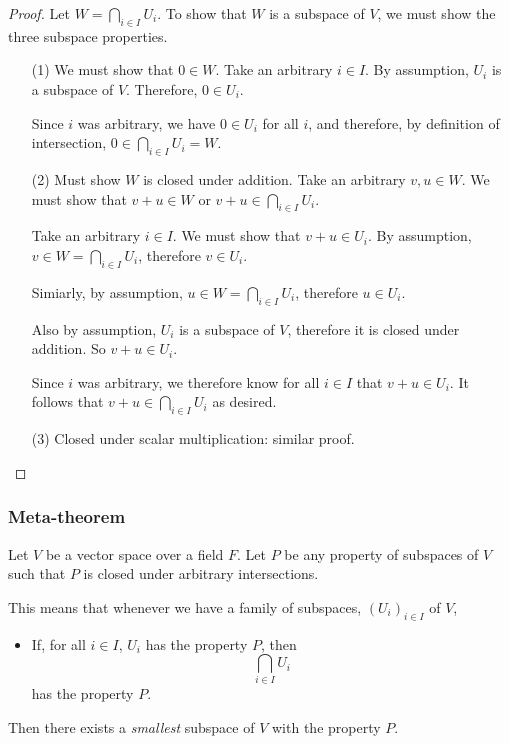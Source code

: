 \documentclass[11pt]{article}
\begin{document}
    \begin{proof}
        Let \(W = \bigcap_{i \in I} U_i\). To show that $W$ is a subspace of $V$, we must show the three subspace properties.
        \begin{enumerate}
            \item[(1)] We must show that \(0 \in W\). Take an arbitrary \(i \in I\). By assumption, \(U_i\) is a subspace of $V$. Therefore, \(0 \in U_i\).
            
            Since $i$ was arbitrary, we have \(0 \in U_i\) for all $i$, and therefore, by definition of intersection, \(0 \in \bigcap_{i \in I} U_i = W\).

            \item[(2)] Must show $W$ is closed under addition. Take an arbitrary \(v,u \in W\). We must show that \(v + u \in W\) or \(v + u \in \bigcap_{i \in I} U_i\).
            
            Take an arbitrary \(i \in I\). We must show that \(v + u \in U_i\). By assumption, \(v \in W = \bigcap_{i \in I} U_i\), therefore \(v \in U_i\).

            Simiarly, by assumption, \(u \in W = \bigcap_{i \in I} U_i\), therefore \(u \in U_i\).

            Also by assumption, \(U_i\) is a subspace of $V$, therefore it is closed under addition. So \(v + u \in U_i\).

            Since $i$ was arbitrary, we therefore know for all \(i \in I\) that \(v + u \in U_i\). It follows that \(v + u \in \bigcap_{i \in I} U_i\) as desired.

            \item[(3)] Closed under scalar multiplication: similar proof.
        \end{enumerate}
    \end{proof}

    \subsubsection{Meta-theorem}

    Let $V$ be a vector space over a field $F$. Let $P$ be any property of subspaces of $V$ such that $P$ is closed under arbitrary intersections.

    This means that whenever we have a family of subspaces, \((U_i)_{i \in I}\) of $V$,
    \begin{itemize}
        \item If, for all \(i \in I\), \(U_i\) has the property $P$, then \[\bigcap_{i \in I} U_i\] has the property $P$.
    \end{itemize}
    Then there exists a \emph{smallest} subspace of $V$ with the property $P$.
\end{document}
